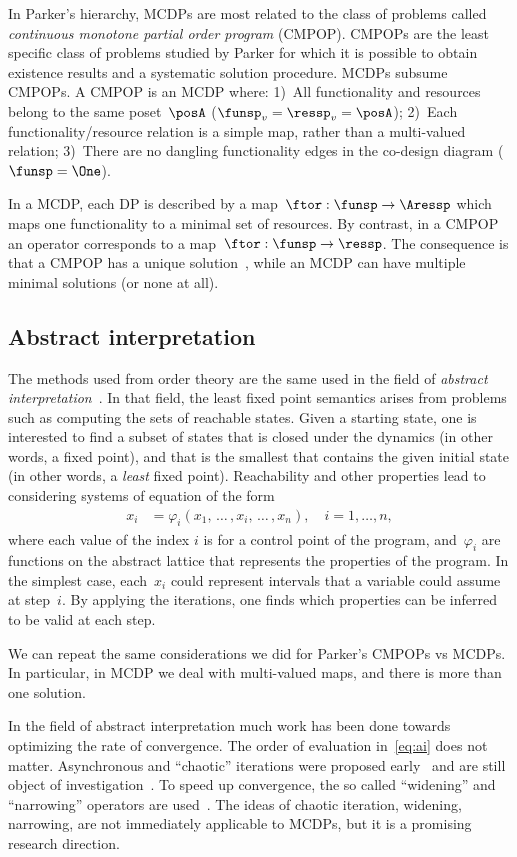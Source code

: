 In Parker's hierarchy, MCDPs are most related to the class of problems called \emph{continuous monotone partial order program} (CMPOP).
CMPOPs are the least specific class of problems studied by Parker for which it is possible to obtain existence results and a systematic solution procedure.
MCDPs subsume CMPOPs.
A CMPOP is an MCDP where: 1)~All functionality and resources belong to the same poset~$\posA$ ($\funsp_{v}=\ressp_{v}=\posA$);
2)~Each functionality/resource relation is a simple map, rather than a multi-valued relation; 3)~There are no dangling functionality edges in the co-design diagram ($\funsp=\One$).

In a MCDP, each DP is described by a \scottcontinuous map~$\ftor:\funsp\rightarrow\Aressp$
which maps one functionality to a minimal set of resources.
By contrast,
in a CMPOP an operator corresponds to a \scottcontinuous map~$\ftor:\funsp\rightarrow\ressp$.
The consequence is that a CMPOP has a unique solution~\cite[Theorem 8]{parkerjr89partial},
while an MCDP can have multiple minimal solutions (or none at all).

\subsection{Abstract interpretation}

The methods used from order theory are the same used in the field of \emph{abstract interpretation}~\cite{cousot14abstract}.
In that field, the least fixed point semantics arises from problems such as computing the sets of reachable states.
Given a starting state,
one is interested to find a subset of states that is closed under the dynamics (in other words, a fixed point), and that is the smallest that contains the given initial state (in other words, a \emph{least} fixed point).
Reachability and other properties lead to considering systems of equation of the form
\begin{align}
    x_{i} & =\varphi_{i}(x_{1},\,\dots\,,x_{i},\,\dots\,,x_{n}),\quad i=1,\dots,n,\label{eq:ai}
\end{align}
where each value of the index $i$ is for a control point of the program,
and~$\varphi_{i}$ are \scottcontinuous functions on the abstract lattice that represents the properties of the program.
In the simplest case, each~$x_{i}$ could represent intervals that a variable could assume at step~$i$.
By applying the iterations, one finds which properties can be inferred to be valid at each step.

We can repeat the same considerations we did for Parker's CMPOPs vs
MCDPs.
In particular, in MCDP we deal with multi-valued maps, and there is more than one solution.

In the field of abstract interpretation much work has been done towards optimizing the rate of convergence.
The order of evaluation in~\cref{eq:ai}
does not matter.
Asynchronous and ``chaotic'' iterations were proposed early~\cite{cousot77asynchronous} and are still object of investigation~\cite{bourdoncleefficient}.
To speed up convergence, the so called ``widening'' and ``narrowing''
operators are used~\cite{cortesi11widening}.
The ideas of chaotic iteration, widening, narrowing, are not immediately applicable to
MCDPs, but it is a promising research direction.

